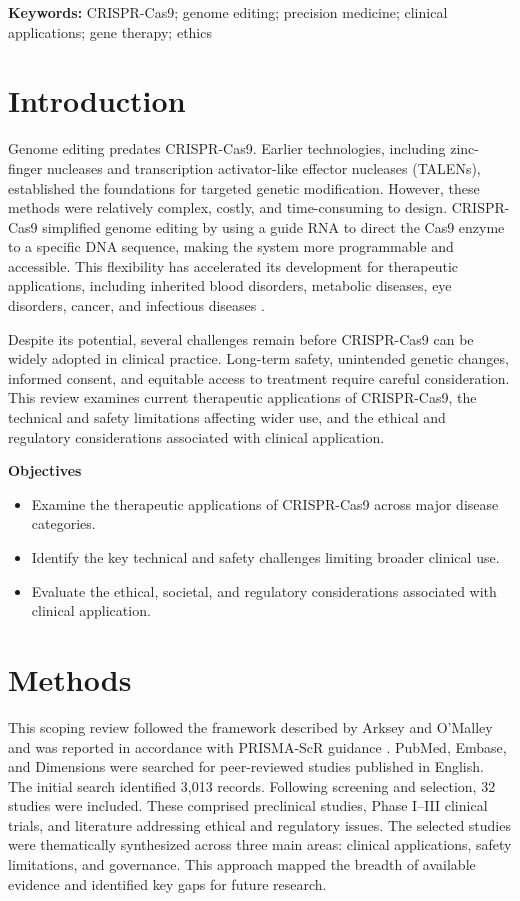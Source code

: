 \documentclass[11pt,a4paper]{article}
\begin{document}
\textbf{Keywords:} CRISPR-Cas9; genome editing; precision medicine; clinical applications; gene therapy; ethics

\section{Introduction}

Genome editing predates CRISPR-Cas9. Earlier technologies, including zinc-finger nucleases and transcription activator-like effector nucleases (TALENs), established the foundations for targeted genetic modification. However, these methods were relatively complex, costly, and time-consuming to design. CRISPR-Cas9 simplified genome editing by using a guide RNA to direct the Cas9 enzyme to a specific DNA sequence, making the system more programmable and accessible. This flexibility has accelerated its development for therapeutic applications, including inherited blood disorders, metabolic diseases, eye disorders, cancer, and infectious diseases \cite{badru2026,frangoul2024,gillmore2021}.

Despite its potential, several challenges remain before CRISPR-Cas9 can be widely adopted in clinical practice. Long-term safety, unintended genetic changes, informed consent, and equitable access to treatment require careful consideration. This review examines current therapeutic applications of CRISPR-Cas9, the technical and safety limitations affecting wider use, and the ethical and regulatory considerations associated with clinical application.

\textbf{Objectives}

\begin{itemize}[nosep]
\item Examine the therapeutic applications of CRISPR-Cas9 across major disease categories.
\item Identify the key technical and safety challenges limiting broader clinical use.
\item Evaluate the ethical, societal, and regulatory considerations associated with clinical application.
\end{itemize}

\section{Methods}\label{methods}

This scoping review followed the framework described by Arksey and O'Malley and was reported in accordance with PRISMA-ScR guidance \cite{arksey2005}. PubMed, Embase, and Dimensions were searched for peer-reviewed studies published in English. The initial search identified 3,013 records. Following screening and selection, 32 studies were included. These comprised preclinical studies, Phase I--III clinical trials, and literature addressing ethical and regulatory issues. The selected studies were thematically synthesized across three main areas: clinical applications, safety limitations, and governance. This approach mapped the breadth of available evidence and identified key gaps for future research.
\end{document}
